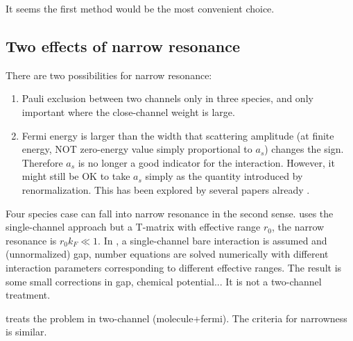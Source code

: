 \documentclass{article}
\begin{document}
It seems the first method would be the most convenient choice.  

\subsection{Two effects of narrow resonance}
There are two possibilities for narrow resonance:  
\begin{enumerate}
\item Pauli exclusion between two channels only in three species, and only important where the close-channel weight is large.  
\item Fermi energy is larger than the width that scattering amplitude (at finite energy, NOT zero-energy value simply proportional to $a_{s}$) changes the sign.  Therefore $a_{s}$ is no longer a good indicator for the interaction.  However, it might still be OK to take $a_{s}$ simply as the quantity introduced by renormalization.   This has been explored by several papers already \cite{NarrowJensen1,NarrowJensen,GurarieNarrow}.  
\end{enumerate}
Four species case can fall into narrow resonance in  the second sense.  \cite{NarrowJensen1,NarrowJensen} uses the single-channel approach but a T-matrix with effective range $r_{0}$, the narrow resonance is $r_{0}k_{F}\ll1$.  In \cite{NarrowJensen}, a single-channel bare interaction is assumed and (unnormalized) gap, number equations  are  solved numerically with different interaction parameters corresponding to different effective ranges. The result is some small corrections in gap, chemical potential...   It is not a two-channel treatment.  

\cite{GurarieNarrow} treats the problem in two-channel (molecule+fermi).  The criteria for narrowness is similar.  
\end{document}
